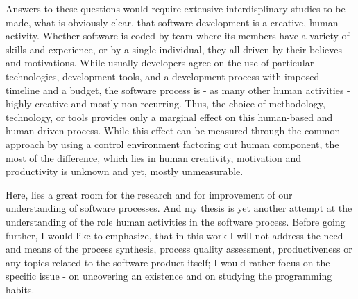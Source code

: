 Answers to these questions would require extensive interdisplinary studies to be made, what is 
obviously clear, that software development is a creative, human activity. Whether software is coded 
by team where its members have a variety of skills and experience, or by a single individual,
they all driven by their believes and motivations. While usually developers agree on the use of 
particular technologies, development tools, and a development process with imposed timeline and 
a budget, the software process is - as many other human activities - highly creative and mostly 
non-recurring. Thus, the choice of methodology, technology, or tools provides only a marginal 
effect on this human-based and human-driven process. While this effect can be measured through 
the common approach by using a control environment factoring out human component, the most of 
the difference, which lies in human creativity, motivation and productivity is unknown and yet, 
mostly unmeasurable.

Here, lies a great room for the research and for improvement of our understanding of software 
processes. And my thesis is yet another attempt at the understanding of the role human activities 
in the software process. Before going further, I would like to emphasize, that in this work I will not 
address the need and means of the process synthesis, process quality assessment, productiveness
or any topics related to the software product itself; I would rather focus on the specific issue - 
on uncovering an existence and on studying the programming habits. 






